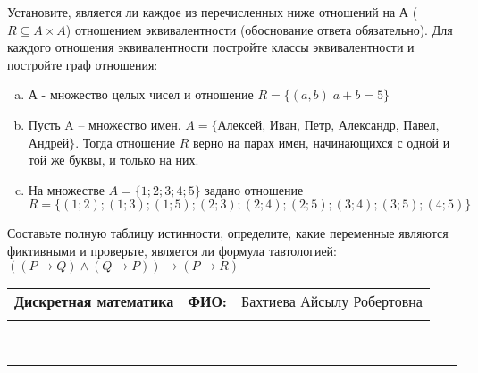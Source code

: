 \documentclass[10pt]{exam}
\newcommand{\class}{Дискретная математика}
\newcommand{\examdate}{}
\begin{document}
\begin{questions}
\question
Установите, является ли каждое из перечисленных ниже отношений на А ($R \subseteq A \times A$) отношением эквивалентности (обоснование ответа обязательно). Для каждого отношения эквивалентности постройте классы 
эквивалентности и постройте граф отношения:
\begin{enumerate} [a)]\setcounter{enumi}{0}
\item А - множество целых чисел и отношение $R = \{(a,b)|a + b = 5\}$
\item Пусть A – множество имен. $A = \{ $Алексей, Иван, Петр, Александр, Павел, Андрей$ \}$. Тогда отношение $R $ верно на парах имен, начинающихся с одной и той же буквы, и только на них.
\item На множестве $A = \{1; 2; 3; 4; 5\}$ задано отношение $R = \{(1; 2); (1; 3); (1; 5); (2; 3); (2; 4); (2; 5); (3; 4); (3; 5); (4; 5)\}$
\end{enumerate}\question Составьте полную таблицу истинности, определите, какие переменные являются фиктивными и проверьте, является ли формула тавтологией:
$(( P \rightarrow Q) \land (Q \rightarrow P)) \rightarrow (P \rightarrow R)$

\end{questions}
\newpage
\begin{flushright}
\begin{tabular}{p{2.8in} r l}
\textbf{\class} & \textbf{ФИО:} &Бахтиева Айсылу Робертовна
\\

\textbf{\examdate} &&\\
\end{tabular}\\
\end{flushright}
\rule[1ex]{\textwidth}{.1pt}
\end{document}
